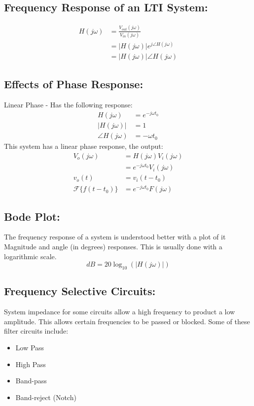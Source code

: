 \documentclass[a5paper]{article}
\newcommand{\For}{\mathcal{F}}
\begin{document}
	\subsection{Frequency Response of an LTI System:}
	\begin{align*}
		H(j\omega)&=\frac{V_{out}(j\omega)}{V_{in}(j\omega)}\\
		&=|H(j\omega)|e^{j\angle H(j\omega)}\\
		&=|H(j\omega)|\angle H(j\omega)
	\end{align*}
	\subsection{Effects of Phase Response:}
	Linear Phase - Has the following response:
	\begin{align*}
		H(j\omega)&=e^{-j\omega t_{0}}\\
		|H(j\omega)|&=1\\
		\angle H(j\omega)&=-\omega t_{0}
	\end{align*}
	This system has a linear phase response, the output:
	\begin{align*}
		V_{o}(j\omega)&=H(j\omega)V_{i}(j\omega)\\
		&=e^{-j\omega t_{0}}V_{i}(j\omega)\\
		v_{o}(t)&=v_{i}(t-t_{0})\\
		\For\{f(t-t_{0})\}&=e^{-j\omega t_{0}}F(j\omega)
	\end{align*}
	\subsection{Bode Plot:}
	The frequency response of a system is understood better with a plot of it Magnitude and angle (in degrees) responses. This is usually done with a logarithmic scale.
	$$dB=20\log_{10}(|H(j\omega)|)$$
	\subsection{Frequency Selective Circuits:}
	System impedance for some circuits allow a high frequency to product a low amplitude. This allows certain frequencies to be passed or blocked. Some of these filter circuits include:
	\begin{itemize}
		\item Low Pass
		\item High Pass
		\item Band-pass
		\item Band-reject (Notch)
	\end{itemize}
\end{document}
